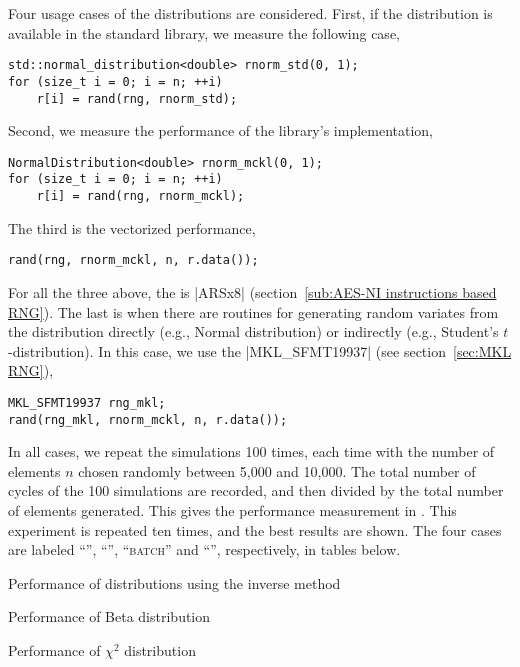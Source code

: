 Four usage cases of the distributions are considered. First, if the
distribution is available in the standard library, we measure the following
case,
\begin{verbatim}
std::normal_distribution<double> rnorm_std(0, 1);
for (size_t i = 0; i = n; ++i)
    r[i] = rand(rng, rnorm_std);
\end{verbatim}
Second, we measure the performance of the library's implementation,
\begin{verbatim}
NormalDistribution<double> rnorm_mckl(0, 1);
for (size_t i = 0; i = n; ++i)
    r[i] = rand(rng, rnorm_mckl);
\end{verbatim}
The third is the vectorized performance,
\begin{verbatim}
rand(rng, rnorm_mckl, n, r.data());
\end{verbatim}
For all the three above, the \rng is |ARSx8| (section~\ref{sub:AES-NI
instructions based RNG}). The last is when there are \mkl routines for
generating random variates from the distribution directly (e.g., Normal
distribution) or indirectly (e.g., Student's $t$-distribution). In this case,
we use the \rng |MKL_SFMT19937| (see section~\ref{sec:MKL RNG}),
\begin{verbatim}
MKL_SFMT19937 rng_mkl;
rand(rng_mkl, rnorm_mckl, n, r.data());
\end{verbatim}
In all cases, we repeat the simulations 100 times, each time with the number of
elements $n$ chosen randomly between 5,000 and 10,000. The total number of
cycles of the 100 simulations are recorded, and then divided by the total
number of elements generated. This gives the performance measurement in \cpe.
This experiment is repeated ten times, and the best results are shown. The four
cases are labeled ``\std'', ``\mckl'', ``\textsc{batch}'' and ``\mkl'',
respectively, in tables below.

\begin{table}
  \caption{Performance of distributions using the inverse method}
  \label{tab:Performance of distributions using the inverse method}
\end{table}

\begin{table}
  \caption{Performance of Beta distribution}
  \label{tab:Performance of Beta distribution}
\end{table}

\begin{table}
  \caption{Performance of $\chi^2$ distribution}
  \label{tab:Performance of chi-squared distribution}
\end{table}

